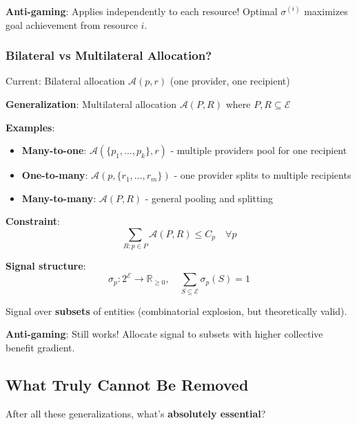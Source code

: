 \documentclass[11pt,a4paper]{article}
\theoremstyle{definition}
\theoremstyle{remark}
\newcommand{\E}{\mathcal{E}}
\begin{document}
\textbf{Anti-gaming}: Applies independently to each resource! Optimal $\sigma^{(i)}$ maximizes goal achievement from resource $i$.

\subsubsection{Bilateral vs Multilateral Allocation?}

Current: Bilateral allocation $\mathcal{A}(p,r)$ (one provider, one recipient)

\textbf{Generalization}: Multilateral allocation $\mathcal{A}(P, R)$ where $P, R \subseteq \E$

\textbf{Examples}:
\begin{itemize}
\item \textbf{Many-to-one}: $\mathcal{A}(\{p_1, \ldots, p_k\}, r)$ - multiple providers pool for one recipient
\item \textbf{One-to-many}: $\mathcal{A}(p, \{r_1, \ldots, r_m\})$ - one provider splits to multiple recipients
\item \textbf{Many-to-many}: $\mathcal{A}(P, R)$ - general pooling and splitting
\end{itemize}

\textbf{Constraint}:
\[ \sum_{R: p \in P} \mathcal{A}(P, R) \le C_p \quad \forall p \]

\textbf{Signal structure}:
\[ \sigma_p: 2^{\E} \to \mathbb{R}_{\ge 0}, \quad \sum_{S \subseteq \E} \sigma_p(S) = 1 \]

Signal over \textbf{subsets} of entities (combinatorial explosion, but theoretically valid).

\textbf{Anti-gaming}: Still works! Allocate signal to subsets with higher collective benefit gradient.

\subsection{What Truly Cannot Be Removed}

After all these generalizations, what's \textbf{absolutely essential}?
\end{document}
